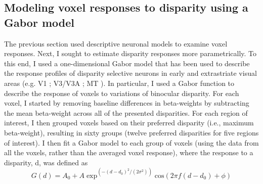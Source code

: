 \subsection{Modeling voxel responses to disparity using a Gabor model}
The previous section used descriptive neuronal models to examine voxel responses. Next, I sought to estimate disparity responses more parametrically. To this end, I used a one-dimensional Gabor model that has been used to describe the response profiles of disparity selective neurons in early and extrastriate visual areas (e.g. V1 \cite{Prince:2002uq}; V3/V3A \cite{Anzai:2011gb}; MT \cite{DeAngelis:2003nh}). In particular, I used a Gabor function to describe the response of voxels to variations of binocular disparity. For each voxel, I started by removing baseline differences in beta-weights by subtracting the mean beta-weight across all of the presented disparities. For each region of interest, I then grouped voxels based on their preferred disparity (i.e., maximum beta-weight), resulting in sixty groups (twelve preferred disparities for five regions of interest). I then fit a Gabor model to each group of voxels (using the data from all the voxels, rather than the averaged voxel response), where the response to a disparity, d, was defined as
\begin{equation}
G(d)= A_0  + A\exp^{(-(d-d_{0})^2/(2 \sigma ^2 ))}\mathrm{cos}(2 \pi f(d-d_0)+ \phi )
\end{equation}
